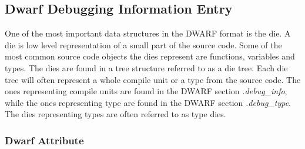\subsection{Dwarf Debugging Information Entry}
 


One of the most important data structures in the \gls{DWARF} format is the \gls{die}.
A \gls{die} is low level representation of a small part of the source code.
Some of the most common source code objects the \glspl{die} represent are functions, variables and types.
The \glspl{die} are found in a tree structure referred to as a \gls{die} tree.
Each \gls{die} tree will often represent a whole compile unit or a type from the source code.
The ones representing compile units are found in the \gls{DWARF} section \emph{.debug\_info}, while the ones representing type are found in the \gls{DWARF} section \emph{.debug\_type}.
The \glspl{die} representing types are often referred to as type \glspl{die}.




\subsubsection{Dwarf Attribute}\label{sec:dwarfattributes}
 
